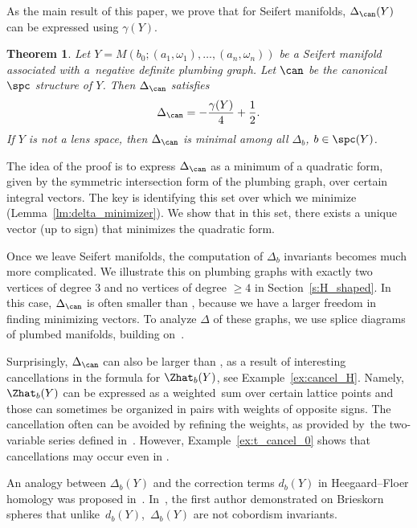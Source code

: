 \documentclass[10pt,a4paper]{amsart}
\newcounter{theorem}
\newtheorem{Theorem}{Theorem}[section]
\begin{document}
As the main result of this paper, we prove that for Seifert manifolds, $\Delta_{\can}(Y)$ can be expressed using $\gamma(Y)$.

\begin{Theorem}\label{thm:seifert_hom}
 Let $Y = M(b_0;(a_1, \omega_1), \dots, (a_n, \omega_n))$ be a Seifert manifold associated with a~negative definite plumbing graph. Let $\can$ be the canonical $\spc$ structure of $Y$. Then $\Delta_{\can}$ satisfies
\begin{gather*}
 \Delta_{\can} = -\frac{\gamma(Y)}{4} + \frac{1}{2}.
\end{gather*}
If $Y$ is not a lens space, then $\Delta_{\can}$ is minimal among all $\Delta_b$, $b \in \spc(Y)$.
\end{Theorem}

The idea of the proof is to express $\Delta_{\can}$ as a minimum of a quadratic form, given by the symmetric intersection form of the plumbing graph, over certain integral vectors. The key is identifying this set over which we minimize (Lemma~\ref{lm:delta_minimizer}). We show that in this set, there exists a unique vector (up to sign) that minimizes the quadratic form.

Once we leave Seifert manifolds, the computation of $\Delta_b$ invariants becomes much more complicated. We illustrate this on plumbing graphs with exactly two vertices of degree 3 and no vertices of degree $\geq 4$ in Section~\ref{s:H_shaped}. In this case, $\Delta_{\can}$ is often smaller than , because we have a larger freedom in finding minimizing vectors. To analyze $\Delta$ of these graphs, we use splice diagrams~\cite{NeumannWallBook86,NW05a, Sie80} of plumbed manifolds, building on~\cite{GKS23}.

Surprisingly, $\Delta_{\can}$ can also be larger than , as a result of interesting cancellations in the formula for $\Zhat_b(Y)$, see Example~\ref{ex:cancel_H}. Namely, $\Zhat_b(Y)$ can be expressed as a weighted~sum over certain lattice points and those can sometimes be organized in pairs with weights of opposite signs.
The cancellation often can be avoided by refining the weights, as provided by~the two-variable series  defined in~\cite{AJK23}. However, Example~\ref{ex:t_cancel_0} shows that cancellations may occur even in .

An analogy between $\Delta_b(Y)$ and the correction terms $d_b(Y)$ in Heegaard--Floer homology was proposed in~\cite{GPP21}. In~\cite{harichurn2023deltaa}, the first author demonstrated on Brieskorn spheres that unlike~$d_b(Y)$,~$\Delta_b(Y)$ are not cobordism invariants.
\end{document}
